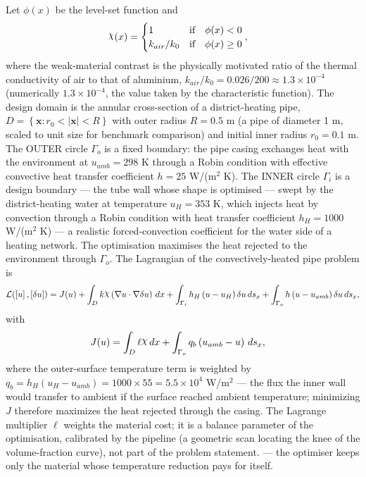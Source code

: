 \documentclass[preview]{standalone}
\let\oldcdot\cdot
\let\cdot\oldcdot
\begin{document}
Let $\phi(x)$ be the level-set function and
 \begin{align*}\raisebox{\depth}{$\chi$}(x) &= \begin{cases} 1 & \mbox{if}\quad \phi(x) < 0 \\ k_{air}/k_0 & \mbox{if}\quad \phi(x)  \ge 0 \end{cases},\end{align*}
where the weak-material contrast is the physically motivated ratio of the thermal conductivity of air to that of aluminium, $k_{air}/k_0 = 0.026/200 \approx 1.3 \times 10^{-4}$ (numerically $1.3 \times 10^{-4}$, the value taken by the characteristic function).
The design domain is the annular cross-section of a district-heating pipe, $D = \left\{ \mathbf x : r_0 < \left|\mathbf x\right| < R \right\}$ with outer radius $R = 0.5$ m (a pipe of diameter 1 m, scaled to unit size for benchmark comparison) and initial inner radius $r_0 = 0.1$ m.  The OUTER circle $\Gamma_o$ is a fixed boundary: the pipe casing exchanges heat with the environment at $u_{amb} = 298$ K through a Robin condition with effective convective heat transfer coefficient $h = 25$ W/(m$^{2}$ K).  The INNER circle $\Gamma_i$ is a design boundary — the tube wall whose shape is optimised — swept by the district-heating water at temperature $u_H = 353$ K, which injects heat by convection through a Robin condition with heat transfer coefficient $h_H = 1000$ W/(m$^{2}$ K) — a realistic forced-convection coefficient for the water side of a heating network.  The optimisation maximises the heat rejected to the environment through $\Gamma_o$.
The Lagrangian of the convectively-heated pipe problem is
\begin{dmath*}
\mathcal L(\left[ u\right],\left[ \delta u\right]) = J(u) +  \int_{D} k \raisebox{\depth}{$\chi$} \left(  \nabla u  \cdot  \nabla \delta u  \right) \,dx + \int_{\Gamma_i} h_H \left( u - u_{H}\right) \delta u \,ds_x + \int_{\Gamma_o} h \left( u - u_{amb}\right) \delta u \,ds_x ,
\end{dmath*}
with
\begin{align*}
J(u) &=  \int_{D} \ell \raisebox{\depth}{$\chi$} \,dx + \int_{\Gamma_o} q_b \left( u_{amb} - u\right) \,ds_x ,
 \end{align*}
where the outer-surface temperature term is weighted by $q_b = h_H \left( u_H - u_{amb}\right) = 1000 \times 55 = 5.5 \times 10^{4}$ W/m$^{2}$ — the flux the inner wall would transfer to ambient if the surface reached ambient temperature; minimizing $J$ therefore maximizes the heat rejected through the casing.  The Lagrange multiplier $\ell$ weights the material cost; it is a balance parameter of the optimisation, calibrated by the pipeline (a geometric scan locating the knee of the volume-fraction curve), not part of the problem statement. — the optimiser keeps only the material whose temperature reduction pays for itself.
\end{document}
